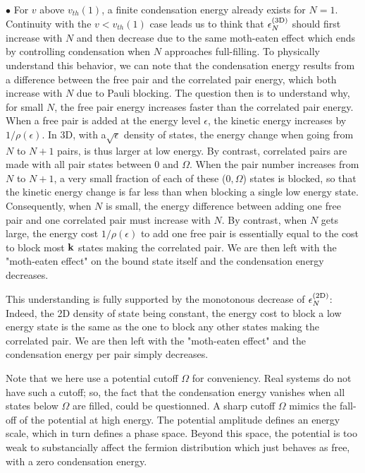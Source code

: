 \documentclass[5p,twocolumn]{elsarticle}
\begin{document}
$\bullet$  For $v$ above $v_{th}(1)$, a finite condensation energy already exists for $N=1$. Continuity with the $v<v_{th}(1)$ case leads us to think that $\epsilon^{{\text{(3D)}}}_N$ should first increase with $N$ and then decrease due to the same moth-eaten effect which ends by controlling condensation when $N$ approaches full-filling. 
To physically understand this behavior, we can note that the condensation energy results from a difference between the free pair and the correlated pair energy, which both increase with $N$ due to Pauli blocking.  The question then is to understand why, for small $N$, the free pair energy increases faster than the correlated pair energy. When a free pair is added at the energy level $\epsilon$, the kinetic energy increases by $1/\rho(\epsilon)$.  In 3D, with a$\sqrt{\epsilon}$ density of states, the energy change when going from $N$ to $N+1$ pairs, is thus larger at low energy. By contrast, correlated pairs are made with all pair states between $0$ and $\Omega$. When the pair number increases from $N$ to $N+1$, a very small fraction of each of these ($0,\Omega$) states is blocked, so that the kinetic energy change is far less than when blocking a single low energy state.  Consequently, when $N$ is small,  the energy difference between adding one free pair and one correlated pair must increase with $N$. By contrast, when $N$ gets large, the energy cost $1/\rho(\epsilon)$ to add one free pair is essentially equal to the cost to block most $\mathbf{k}$ states making the correlated pair.  We are then left with the "moth-eaten effect" on the bound state itself and the condensation energy decreases. 

This understanding is fully supported by the monotonous decrease of $\epsilon^{{\text{(2D)}}}_N$: Indeed, the 2D density of state being constant, the energy cost to block a low energy state is the same as the one to block  any other states making the correlated pair. We are then left with the "moth-eaten effect" and the condensation energy per pair simply decreases.

Note that we here use a potential cutoff $\Omega$ for conveniency.  Real systems do not have such a cutoff; so,   the fact that the condensation energy vanishes when all states below $\Omega$ are filled, could be questionned.  A sharp cutoff $\Omega$ mimics the fall-off of the potential at high energy.  The potential amplitude defines an energy scale, which in turn defines a phase space.  Beyond this space, the potential is too weak to substancially affect the fermion distribution which just behaves as free, with a zero condensation energy. 
\end{document}
